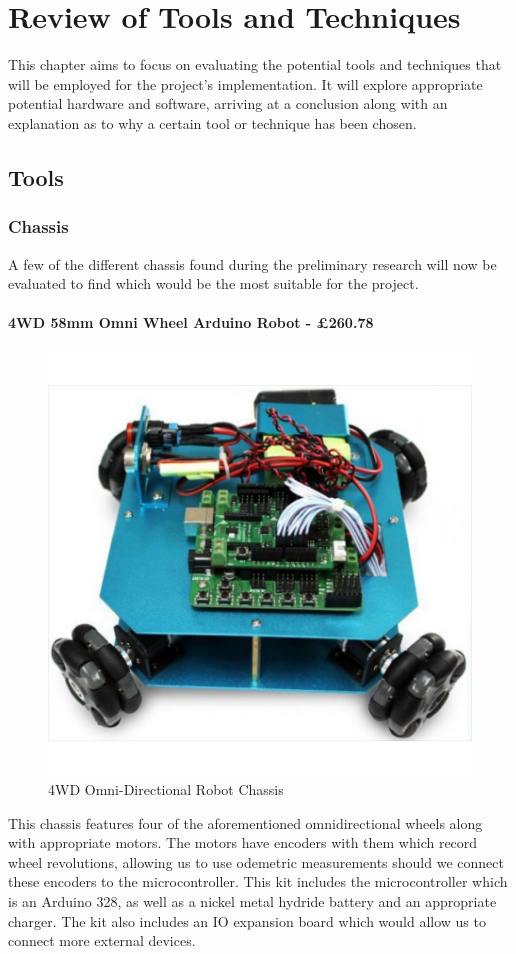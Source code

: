 		\chapter{Review of Tools and Techniques}
		This chapter aims to focus on evaluating the potential tools and techniques that will be employed for the project's implementation. It will explore appropriate potential hardware and software, arriving at a conclusion along with an explanation as to why a certain tool or technique has been chosen.
			\section{Tools}
				\subsection{Chassis}
					A few of the different chassis found during the preliminary research will now be evaluated to find which would be the most suitable for the project.
					
					\subsubsection{4WD 58mm Omni Wheel Arduino Robot - \pounds{260.78}}
					\begin{figure}[h]
						\centering
						\includegraphics[width=.3\linewidth]{ANALYSIS/4wdomnidirectionalarduino.jpg}
						\caption{4WD Omni-Directional Robot Chassis}
						\label{4WD Omni-Directional Robot Chassis}
					\end{figure}
					This chassis features four of the aforementioned omnidirectional wheels along with appropriate motors. The motors have encoders with them which record wheel revolutions, allowing us to use odemetric measurements should we connect these encoders to the microcontroller. This kit includes the microcontroller which is an Arduino 328, as well as a nickel metal hydride battery and an appropriate charger. The kit also includes an IO expansion board which would allow us to connect more external devices\cite{4wdArduinoChassis}.
					
